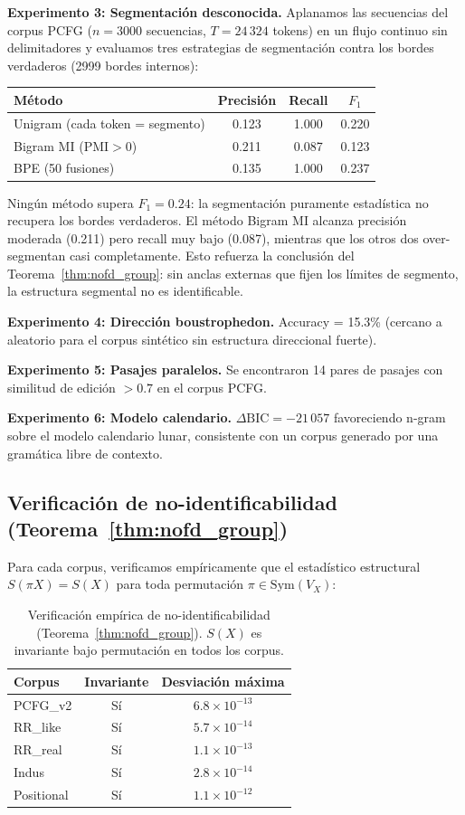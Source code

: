 \documentclass[11pt,a4paper]{article}
\newcommand{\1}{\mathbf{1}}
\numberwithin{equation}{section}
\begin{document}
\textbf{Experimento 3: Segmentación desconocida.} Aplanamos las secuencias del corpus PCFG ($n=3000$ secuencias, $T=24\,324$ tokens) en un flujo continuo sin delimitadores y evaluamos tres estrategias de segmentación contra los bordes verdaderos (2999 bordes internos):
\begin{center}
\begin{tabular}{lccc}
\toprule
Método & Precisión & Recall & $F_1$ \\
\midrule
Unigram (cada token = segmento) & 0.123 & 1.000 & 0.220 \\
Bigram MI ($\mathrm{PMI} > 0$) & 0.211 & 0.087 & 0.123 \\
BPE (50 fusiones) & 0.135 & 1.000 & 0.237 \\
\bottomrule
\end{tabular}
\end{center}
Ningún método supera $F_1 = 0.24$: la segmentación puramente estadística no recupera los bordes verdaderos. El método Bigram MI alcanza precisión moderada (0.211) pero recall muy bajo (0.087), mientras que los otros dos over-segmentan casi completamente. Esto refuerza la conclusión del Teorema~\ref{thm:nofd_group}: sin anclas externas que fijen los límites de segmento, la estructura segmental no es identificable.

\textbf{Experimento 4: Dirección boustrophedon.} Accuracy = 15.3\% (cercano a aleatorio para el corpus sintético sin estructura direccional fuerte).

\textbf{Experimento 5: Pasajes paralelos.} Se encontraron 14 pares de pasajes con similitud de edición $>0.7$ en el corpus PCFG.

\textbf{Experimento 6: Modelo calendario.} $\Delta\mathrm{BIC} = -21\,057$ favoreciendo n-gram sobre el modelo calendario lunar, consistente con un corpus generado por una gramática libre de contexto.

\subsection{Verificación de no-identificabilidad (Teorema~\ref{thm:nofd_group})}

Para cada corpus, verificamos empíricamente que el estadístico estructural $S(\pi X) = S(X)$ para toda permutación $\pi \in \mathrm{Sym}(V_X)$:

\begin{table}[h]
\centering
\caption{Verificación empírica de no-identificabilidad (Teorema~\ref{thm:nofd_group}). $S(X)$ es invariante bajo permutación en todos los corpus.}
\label{tab:nonident}
\begin{tabular}{lcc}
\toprule
Corpus & Invariante & Desviación máxima \\
\midrule
PCFG\_v2 & Sí & $6.8 \times 10^{-13}$ \\
RR\_like & Sí & $5.7 \times 10^{-14}$ \\
RR\_real & Sí & $1.1 \times 10^{-13}$ \\
Indus & Sí & $2.8 \times 10^{-14}$ \\
Positional & Sí & $1.1 \times 10^{-12}$ \\
\bottomrule
\end{tabular}
\end{table}
\end{document}
